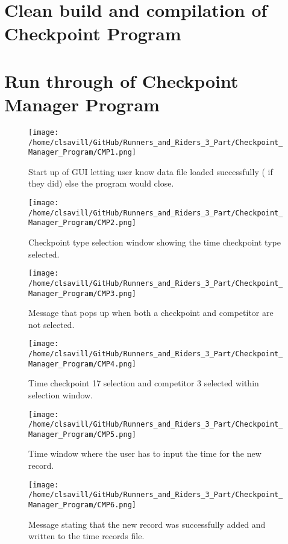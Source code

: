 \documentclass[a4paper,12pt]{article}
\begin{document}
\section{Clean build and compilation of Checkpoint Program}


\section{Run through of Checkpoint Manager Program}
\begin{figure}[H]
\texttt{[image: /home/clsavill/GitHub/Runners\_and\_Riders\_3\_Part/Checkpoint\_Manager\_Program/CMP1.png]}
\caption{Start up of GUI letting user know data file loaded successfully ( if they did) else the program would close.}
\end{figure}

\begin{figure}[H]
\texttt{[image: /home/clsavill/GitHub/Runners\_and\_Riders\_3\_Part/Checkpoint\_Manager\_Program/CMP2.png]}
\caption{Checkpoint type selection window showing the time checkpoint type selected.}
\end{figure}

\begin{figure}[H]
\texttt{[image: /home/clsavill/GitHub/Runners\_and\_Riders\_3\_Part/Checkpoint\_Manager\_Program/CMP3.png]}
\caption{Message that pops up when both a checkpoint and competitor are not selected.}
\end{figure}

\begin{figure}[H]
\texttt{[image: /home/clsavill/GitHub/Runners\_and\_Riders\_3\_Part/Checkpoint\_Manager\_Program/CMP4.png]}
\caption{Time checkpoint 17 selection and competitor 3 selected within selection window.}
\end{figure}

\begin{figure}[H]
\texttt{[image: /home/clsavill/GitHub/Runners\_and\_Riders\_3\_Part/Checkpoint\_Manager\_Program/CMP5.png]}
\caption{Time window where the user has to input the time for the new record.}
\end{figure}

\begin{figure}[H]
\texttt{[image: /home/clsavill/GitHub/Runners\_and\_Riders\_3\_Part/Checkpoint\_Manager\_Program/CMP6.png]}
\caption{Message stating that the new record was successfully added and written to the time records file.}
\end{figure}
\end{document}

